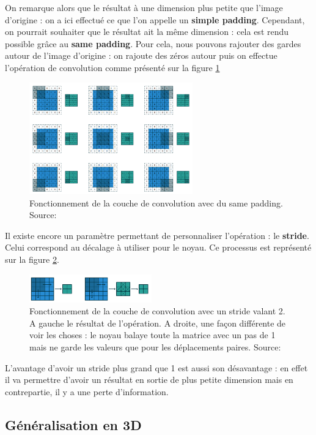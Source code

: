 On remarque alors que le résultat à une dimension plus petite que l'image d'origine : on a ici effectué ce que l'on appelle un \textbf{simple padding}. Cependant, on pourrait souhaiter que le résultat ait la même dimension : cela est rendu possible grâce au \textbf{same padding}. Pour cela, nous pouvons rajouter des gardes autour de l'image d'origine : on rajoute des zéros autour puis on effectue l'opération de convolution comme présenté sur la figure \ref{same_padding}

\begin{figure}[!h]
\centering
\includegraphics[width=200pt]{images/cnn/same_padding.png}
\caption{Fonctionnement de la couche de convolution avec du same padding. Source:\cite{dumoulin_guide_2018} }
\label{same_padding}
\end{figure}

Il existe encore un paramètre permettant de personnaliser l'opération : le \textbf{stride}. Celui correspond au décalage à utiliser pour le noyau. Ce processus est représenté sur la figure \ref{stride}.

\begin{figure}[!h]
\centering
\includegraphics[width=150pt]{images/cnn/stride.png}
\caption{Fonctionnement de la couche de convolution avec un stride valant 2. A gauche le résultat de l'opération. A droite, une façon différente de voir les choses : le noyau balaye toute la matrice avec un pas de 1 mais ne garde les valeurs que pour les déplacements paires. Source:\cite{dumoulin_guide_2018}}
\label{stride}
\end{figure}
 
L'avantage d'avoir un stride plus grand que 1 est aussi son désavantage : en effet il va permettre d'avoir un résultat en sortie de plus petite dimension mais en contrepartie, il y a une perte d'information.

\subsection{Généralisation en 3D}

